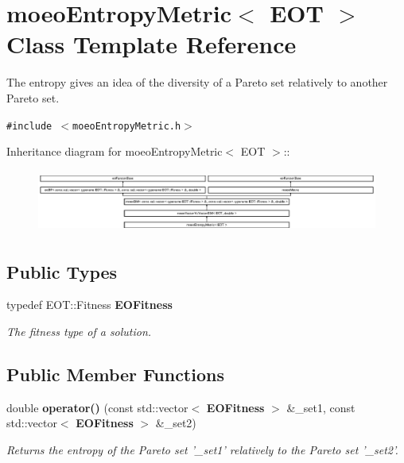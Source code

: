 \section{moeo\-Entropy\-Metric$<$ EOT $>$ Class Template Reference}
\label{classmoeoEntropyMetric}
The entropy gives an idea of the diversity of a Pareto set relatively to another Pareto set.  


{\tt \#include $<$moeo\-Entropy\-Metric.h$>$}

Inheritance diagram for moeo\-Entropy\-Metric$<$ EOT $>$::\begin{figure}[H]
\begin{center}
\leavevmode
\includegraphics[height=2.08644cm]{classmoeoEntropyMetric}
\end{center}
\end{figure}
\subsection*{Public Types}
\begin{CompactItemize}
\item 
typedef EOT::Fitness {\bf EOFitness}\label{classmoeoEntropyMetric_306b72d2236de1ecbae986c65490a8fe}

\begin{CompactList}\small\item\em The fitness type of a solution. \item\end{CompactList}\end{CompactItemize}
\subsection*{Public Member Functions}
\begin{CompactItemize}
\item 
double {\bf operator()} (const std::vector$<$ {\bf EOFitness} $>$ \&\_\-set1, const std::vector$<$ {\bf EOFitness} $>$ \&\_\-set2)
\begin{CompactList}\small\item\em Returns the entropy of the Pareto set '\_\-set1' relatively to the Pareto set '\_\-set2'. \item\end{CompactList}\end{CompactItemize}
